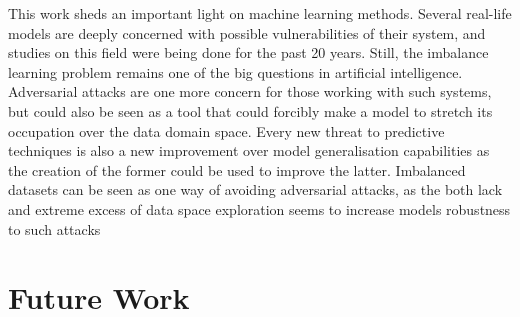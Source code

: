 This work sheds an important light on machine learning methods. Several real-life models are deeply concerned with possible vulnerabilities of their system, and studies on this field were being done for the past 20 years. Still, the imbalance learning problem remains one of the big questions in artificial intelligence. Adversarial attacks are one more concern for those working with such systems, but could also be seen as a tool that could forcibly make a model to stretch its occupation over the data domain space. Every new threat to predictive techniques is also a new improvement over model generalisation capabilities as the creation of the former could be used to improve the latter. Imbalanced datasets can be seen as one way of avoiding adversarial attacks, as the both lack and extreme excess of data space exploration seems to increase models robustness to such attacks

\section{Future Work}